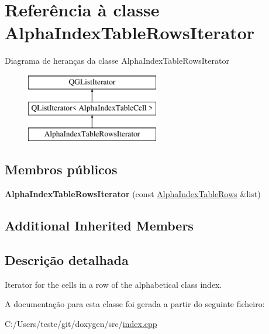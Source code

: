 \hypertarget{class_alpha_index_table_rows_iterator}{\section{Referência à classe Alpha\-Index\-Table\-Rows\-Iterator}
\label{class_alpha_index_table_rows_iterator}
}
Diagrama de heranças da classe Alpha\-Index\-Table\-Rows\-Iterator\begin{figure}[H]
\begin{center}
\leavevmode
\includegraphics[height=3.000000cm]{class_alpha_index_table_rows_iterator}
\end{center}
\end{figure}
\subsection*{Membros públicos}
\begin{DoxyCompactItemize}
\item 
\hypertarget{class_alpha_index_table_rows_iterator_a02bb29d747abae2ffad7f8dd43fa95e2}{{\bfseries Alpha\-Index\-Table\-Rows\-Iterator} (const \hyperlink{class_alpha_index_table_rows}{Alpha\-Index\-Table\-Rows} \&list)}\label{class_alpha_index_table_rows_iterator_a02bb29d747abae2ffad7f8dd43fa95e2}

\end{DoxyCompactItemize}
\subsection*{Additional Inherited Members}


\subsection{Descrição detalhada}
Iterator for the cells in a row of the alphabetical class index. 

A documentação para esta classe foi gerada a partir do seguinte ficheiro\-:\begin{DoxyCompactItemize}
\item 
C\-:/\-Users/teste/git/doxygen/src/\hyperlink{index_8cpp}{index.\-cpp}\end{DoxyCompactItemize}
